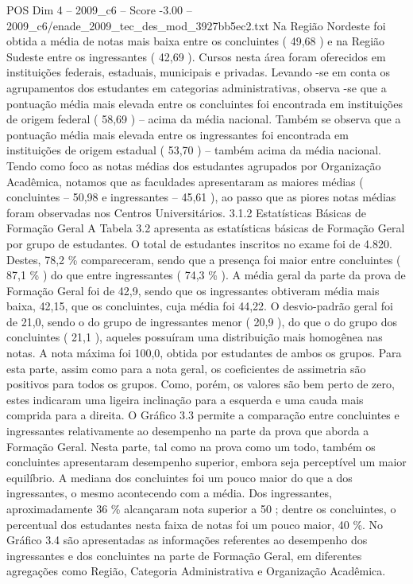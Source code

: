 \begin{textsample}{POS Dim 4 – 2009\_c6 – Score -3.00 – 2009\_c6/enade\_2009\_tec\_des\_mod\_3927bb5ec2.txt}
Na Região Nordeste foi obtida a média de notas mais baixa entre os concluintes ( 49,68 ) e na Região Sudeste entre os ingressantes ( 42,69 ).
Cursos nesta área foram oferecidos em instituições federais, estaduais, municipais e privadas.
Levando -se em conta os agrupamentos dos estudantes em categorias administrativas, observa -se que a pontuação média mais elevada entre os concluintes foi encontrada em instituições de origem federal ( 58,69 ) – acima da média nacional.
Também se observa que a pontuação média mais elevada entre os ingressantes foi encontrada em instituições de origem estadual ( 53,70 ) – também acima da média nacional.
Tendo como foco as notas médias dos estudantes agrupados por Organização Acadêmica, notamos que as faculdades apresentaram as maiores médias ( concluintes – 50,98 e ingressantes – 45,61 ), ao passo que as piores notas médias foram observadas nos Centros Universitários. 3.1.2 Estatísticas Básicas de Formação Geral A Tabela 3.2 apresenta as estatísticas básicas de Formação Geral por grupo de estudantes.
O total de estudantes inscritos no exame foi de 4.820.
Destes, 78,2 \% compareceram, sendo que a presença foi maior entre concluintes ( 87,1 \% ) do que entre ingressantes ( 74,3 \% ).
A média geral da parte da prova de Formação Geral foi de 42,9, sendo que os ingressantes obtiveram média mais baixa, 42,15, que os concluintes, cuja média foi 44,22.
O desvio-padrão geral foi de 21,0, sendo o do grupo de ingressantes menor ( 20,9 ), do que o do grupo dos concluintes ( 21,1 ), aqueles possuíram uma distribuição mais homogênea nas notas.
A nota máxima foi 100,0, obtida por estudantes de ambos os grupos.
Para esta parte, assim como para a nota geral, os coeficientes de assimetria são positivos para todos os grupos.
Como, porém, os valores são bem perto de zero, estes indicaram uma ligeira inclinação para a esquerda e uma cauda mais comprida para a direita.
O Gráfico 3.3 permite a comparação entre concluintes e ingressantes relativamente ao desempenho na parte da prova que aborda a Formação Geral.
Nesta parte, tal como na prova como um todo, também os concluintes apresentaram desempenho superior, embora seja perceptível um maior equilíbrio.
A mediana dos concluintes foi um pouco maior do que a dos ingressantes, o mesmo acontecendo com a média.
Dos ingressantes, aproximadamente 36 \% alcançaram nota superior a 50 ; dentre os concluintes, o percentual dos estudantes nesta faixa de notas foi um pouco maior, 40 \%.
No Gráfico 3.4 são apresentadas as informações referentes ao desempenho dos ingressantes e dos concluintes na parte de Formação Geral, em diferentes agregações como Região, Categoria Administrativa e Organização Acadêmica.

\end{textsample}
